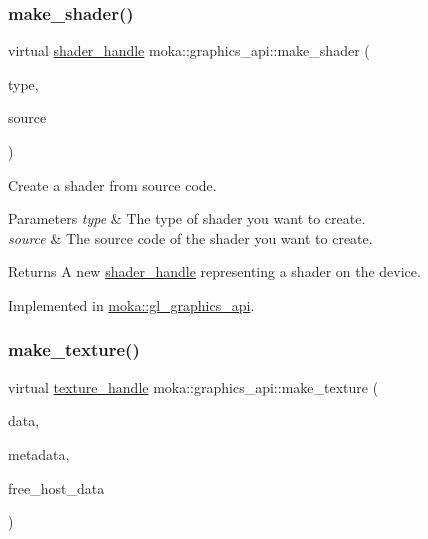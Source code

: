 \subsubsection{\texorpdfstring{make\_shader()}{make\_shader()}}
{\footnotesize\ttfamily virtual \mbox{\hyperlink{structmoka_1_1shader__handle}{shader\+\_\+handle}} moka\+::graphics\+\_\+api\+::make\+\_\+shader (\begin{DoxyParamCaption}\item[{\mbox{\hyperlink{namespacemoka_a472008f32e5db526d38eace7d3e45772}{shader\+\_\+type}}}]{type,  }\item[{const std\+::string \&}]{source }\end{DoxyParamCaption})\hspace{0.3cm}{\ttfamily [pure virtual]}}



Create a shader from source code. 


\begin{DoxyParams}{Parameters}
{\em type} & The type of shader you want to create. \\
\hline
{\em source} & The source code of the shader you want to create. \\
\hline
\end{DoxyParams}
\begin{DoxyReturn}{Returns}
A new \mbox{\hyperlink{structmoka_1_1shader__handle}{shader\+\_\+handle}} representing a shader on the device. 
\end{DoxyReturn}


Implemented in \mbox{\hyperlink{classmoka_1_1gl__graphics__api_a78138ccaae9fe06ea4672dc14a978ed7}{moka\+::gl\+\_\+graphics\+\_\+api}}.

\mbox{\label{classmoka_1_1graphics__api_a61417bde89d91f8ec436e54226339b88}} 
\subsubsection{\texorpdfstring{make\_texture()}{make\_texture()}}
{\footnotesize\ttfamily virtual \mbox{\hyperlink{structmoka_1_1texture__handle}{texture\+\_\+handle}} moka\+::graphics\+\_\+api\+::make\+\_\+texture (\begin{DoxyParamCaption}\item[{void $\ast$$\ast$}]{data,  }\item[{\mbox{\hyperlink{structmoka_1_1texture__metadata}{texture\+\_\+metadata}} \&\&}]{metadata,  }\item[{bool}]{free\+\_\+host\+\_\+data }\end{DoxyParamCaption})\hspace{0.3cm}{\ttfamily [pure virtual]}}




